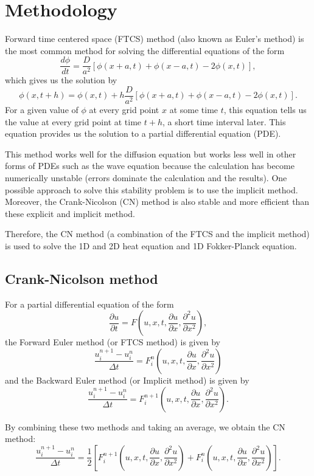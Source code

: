 \documentclass[12pt]{article}		%
\begin{document}
\section*{Methodology}
Forward time centered space (FTCS) method (also known as Euler's method) is the most common method for solving the differential equations of the form 
\[
	\frac{d \phi}{dt} = \frac{D}{a^2}[\phi(x+a, t) + \phi(x-a,t) - 2\phi (x,t)],
\]
which gives us the solution by
\[
	\phi (x, t+h) = \phi (x,t) + h \frac{D}{a^2}[\phi(x+a, t) + \phi(x-a,t) - 2\phi (x,t)].
\]
For a given value of $\phi$ at every grid point $x$ at some time $t$, this equation tells us the value at every grid point at time $t+h$, a short time interval later. This equation provides us the solution to a partial differential equation (PDE).

This method works well for the diffusion equation but works less well in other forms of PDEs such as the wave equation because the calculation has become numerically unstable (errors dominate the calculation and the results). One possible approach to solve this stability problem is to use the implicit method. Moreover, the Crank-Nicolson (CN) method is also stable and more efficient than these explicit and implicit method.

Therefore, the CN method (a combination of the FTCS and the implicit method) is used to solve the 1D and 2D heat equation and 1D Fokker-Planck equation.


\subsection*{Crank-Nicolson method}
For a partial differential equation of the form
\[
	\frac{\partial u}{\partial t} = F \left( u, x, t, \frac{\partial u}{\partial x}, \frac{\partial^2 u}{\partial x^2}  \right),
\]
the Forward Euler method (or FTCS method) is given by
\[
	\frac{u^{n+1}_i - u^n_i}{\Delta t} = F^{n}_i \left(u, x, t, \frac{\partial u}{\partial x}, \frac{\partial^2 u}{\partial x^2} \right)
\]
and the Backward Euler method (or Implicit method) is given by
\[
	\frac{u^{n+1}_i - u^n_i}{\Delta t} = F^{n+1}_i \left(u, x, t, \frac{\partial u}{\partial x}, \frac{\partial^2 u}{\partial x^2} \right).
\]

By combining these two methods and taking an average, we obtain the CN method:
\[
	\frac{u^{n+1}_i - u^n_i}{\Delta t} = \frac{1}{2} [F^{n+1}_i \left(u, x, t, \frac{\partial u}{\partial x}, \frac{\partial^2 u}{\partial x^2} \right) + F^n_i \left(u, x, t, \frac{\partial u}{\partial x}, \frac{\partial^2 u}{\partial x^2} \right)].
\]
\end{document}
